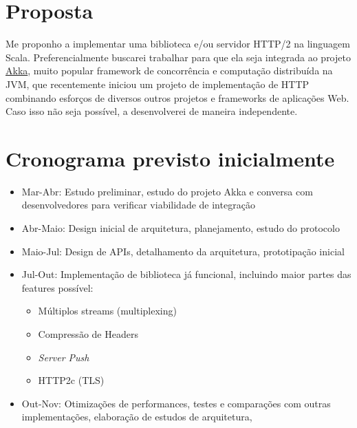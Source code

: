 \documentclass[12pt,a4paper,openright,twoside,]{abntex2}	%
\begin{document}
\maketitle	%



{
\hypersetup{linkcolor=black}
\setcounter{tocdepth}{3}
\noindent\tableofcontents* %
\cleardoublepage
}

\textual	%
\section{Proposta}\label{proposta}

Me proponho a implementar uma biblioteca e/ou servidor HTTP/2 na
linguagem Scala. Preferencialmente buscarei trabalhar para que ela seja
integrada ao projeto \href{http://akka.io}{Akka}, muito popular
framework de concorrência e computação distribuída na JVM, que
recentemente iniciou um projeto de implementação de HTTP combinando
esforços de diversos outros projetos e frameworks de aplicações Web.
Caso isso não seja possível, a desenvolverei de maneira independente.

\section{Cronograma previsto
inicialmente}\label{cronograma-previsto-inicialmente}

\begin{itemize}
\tightlist
\item
  Mar-Abr: Estudo preliminar, estudo do projeto Akka e conversa com
  desenvolvedores para verificar viabilidade de integração
\item
  Abr-Maio: Design inicial de arquitetura, planejamento, estudo do
  protocolo
\item
  Maio-Jul: Design de APIs, detalhamento da arquitetura, prototipação
  inicial
\item
  Jul-Out: Implementação de biblioteca já funcional, incluindo maior
  partes das features possível:

  \begin{itemize}
  \tightlist
  \item
    Múltiplos streams (multiplexing)\\
  \item
    Compressão de Headers\\
  \item
    \emph{Server Push}\\
  \item
    HTTP2c (TLS)\\
  \end{itemize}
\item
  Out-Nov: Otimizações de performances, testes e comparações com outras
  implementações, elaboração de estudos de arquitetura,
\end{itemize}
\end{document}
